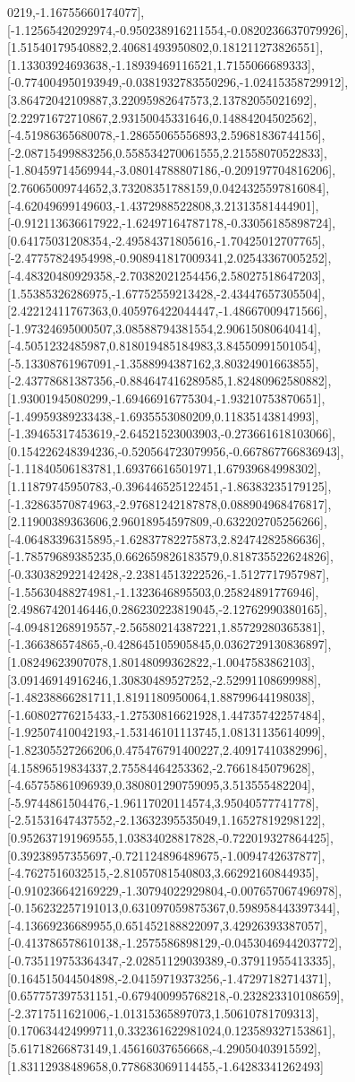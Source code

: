 \documentclass{article}
\begin{document}
0219,-1.16755660174077],[-1.12565420292974,-0.950238916211554,-0.0820236637079926],[1.51540179540882,2.40681493950802,0.181211273826551],[1.13303924693638,-1.18939469116521,1.7155066689333],[-0.774004950193949,-0.0381932783550296,-1.02415358729912],[3.86472042109887,3.22095982647573,2.13782055021692],[2.22971672710867,2.93150045331646,0.14884204502562],[-4.51986365680078,-1.28655065556893,2.59681836744156],[-2.08715499883256,0.558534270061555,2.21558070522833],[-1.80459714569944,-3.08014788807186,-0.209197704816206],[2.76065009744652,3.73208351788159,0.0424325597816084],[-4.62049699149603,-1.4372988522808,3.21313581444901],[-0.912113636617922,-1.62497164787178,-0.33056185898724],[0.64175031208354,-2.49584371805616,-1.70425012707765],[-2.47757824954998,-0.908941817009341,2.02543367005252],[-4.48320480929358,-2.70382021254456,2.58027518647203],[1.55385326286975,-1.67752559213428,-2.43447657305504],[2.42212411767363,0.405976422044447,-1.48667009471566],[-1.97324695000507,3.08588794381554,2.90615080640414],[-4.5051232485987,0.818019485184983,3.84550991501054],[-5.13308761967091,-1.3588994387162,3.80324901663855],[-2.43778681387356,-0.884647416289585,1.82480962580882],[1.93001945080299,-1.69466916775304,-1.93210753870651],[-1.49959389233438,-1.6935553080209,0.11835143814993],[-1.39465317453619,-2.64521523003903,-0.273661618103066],[0.154226248394236,-0.520564723079956,-0.667867766836943],[-1.11840506183781,1.69376616501971,1.67939684998302],[1.11879745950783,-0.396446525122451,-1.86383235179125],[-1.32863570874963,-2.97681242187878,0.088904968476817],[2.11900389363606,2.96018954597809,-0.632202705256266],[-4.06483396315895,-1.62837782275873,2.82474282586636],[-1.78579689385235,0.662659826183579,0.818735522624826],[-0.330382922142428,-2.23814513222526,-1.5127717957987],[-1.55630488274981,-1.1323646895503,0.25824891776946],[2.49867420146446,0.286230223819045,-2.12762990380165],[-4.09481268919557,-2.56580214387221,1.85729280365381],[-1.366386574865,-0.428645105905845,0.0362729130836897],[1.08249623907078,1.80148099362822,-1.0047583862103],[3.09146914916246,1.30830489527252,-2.52991108699988],[-1.48238866281711,1.8191180950064,1.88799644198038],[-1.60802776215433,-1.27530816621928,1.44735742257484],[-1.92507410042193,-1.53146101113745,1.08131135614099],[-1.82305527266206,0.475476791400227,2.40917410382996],[4.15896519834337,2.75584464253362,-2.7661845079628],[-4.65755861096939,0.380801290759095,3.513555482204],[-5.9744861504476,-1.96117020114574,3.95040577741778],[-2.51531647437552,-2.13632395535049,1.16527819298122],[0.952637191969555,1.03834028817828,-0.722019327864425],[0.39238957355697,-0.721124896489675,-1.0094742637877],[-4.7627516032515,-2.81057081540803,3.66292160844935],[-0.910236642169229,-1.30794022929804,-0.007657067496978],[-0.156232257191013,0.631097059875367,0.598958443397344],[-4.13669236689955,0.651452188822097,3.42926393387057],[-0.413786578610138,-1.2575586898129,-0.0453046944203772],[-0.735119753364347,-2.02851129039389,-0.37911955413335],[0.164515044504898,-2.04159719373256,-1.47297182714371],[0.657757397531151,-0.679400995768218,-0.232823310108659],[-2.3717511621006,-1.01315365897073,1.50610781709313],[0.170634424999711,0.332361622981024,0.123589327153861],[5.61718266873149,1.45616037656668,-4.29050403915592],[1.83112938489658,0.778683069114455,-1.64283341262493]
\end{document}
